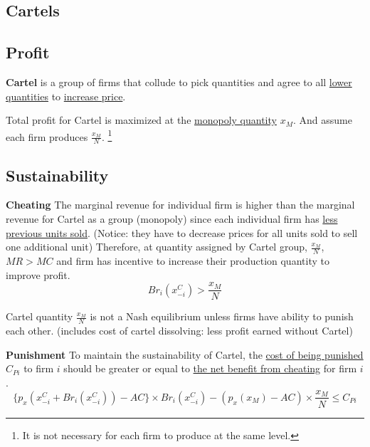 \documentclass[]{article}
\begin{document}
        \subsection{Cartels}
            \subsection{Profit}
                \begin{definition}
                    \textbf{Cartel} is a group of firms that collude to pick quantities and agree to all \ul{lower quantities} to \ul{increase price}.
                \end{definition}
                
                \begin{remark}
                    Total profit for Cartel is maximized at the \ul{monopoly quantity} $x_M$. And assume each firm produces $\frac{x_M}{N}$. \footnote{It is not necessary for each firm to produce at the same level.}
                \end{remark}
                
            \subsection{Sustainability}
                \begin{remark} \textbf{Cheating}
                    The marginal revenue for individual firm is higher than the marginal revenue for Cartel as a group (monopoly) since each individual firm has \ul{less previous units sold}. (Notice: they have to decrease prices for all units sold to sell one additional unit) Therefore, at quantity assigned by Cartel group, $\frac{x_M}{N}$, $MR > MC$ and firm has incentive to increase their production quantity to improve profit. 
                    \[
                        Br_i(x_{-i}^C) > \frac{x_M}{N}
                    \]
                \end{remark}
                
                \begin{remark}
                    Cartel quantity $\frac{x_M}{N}$ is not a Nash equilibrium unless firms have ability to punish each other. (includes cost of cartel dissolving: less profit earned without Cartel)
                \end{remark}
                
                \begin{remark} \textbf{Punishment}
                    To maintain the sustainability of Cartel, the \ul{cost of being punished}$C_{Pi}$ to firm $i$ should be greater or equal to \ul{the net benefit from cheating} for firm $i$.
                    \[
                        \big \{ p_x(x_{-i}^C + Br_i(x_{-i}^C)) - AC \big \} \times Br_i(x_{-i}^C) - (p_x(x_M) - AC) \times \frac{x_M}{N} \leq C_{Pi}
                    \]
                \end{remark}
                
\end{document}
